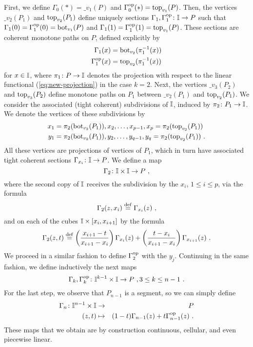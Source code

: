 First, we define $\Gamma_0 (*) = \bm_{v_1}(P)$ and $\Gamma_0^{\mathrm{op}} (*) = \operatorname{top}_{v_1}(P)$.
Then, the vertices $\bm_{v_2}(P_1)$ and $\operatorname{top}_{v_2}(P_1)$ define uniquely sections $\Gamma_1, \Gamma_1^{\mathrm{op}} \colon \mathbb{I} \to P$ such that $\Gamma_1(0)=\Gamma_1^{\mathrm{op}}(0)=\operatorname{bot}_{v_1}(P)$ and $\Gamma_1(1)=\Gamma_1^{\mathrm{op}}(1)=\operatorname{top}_{v_1}(P)$.
These sections are coherent monotone paths on $P$, defined explicitly by
\begin{align*}
	\Gamma_1(x) & = \operatorname{bot}_{v_2}(\pi_1^{-1}(x)) \\
	\Gamma_1^{\mathrm{op}}(x) & = \operatorname{top}_{v_2}(\pi_1^{-1}(x))
\end{align*}
for $x \in \mathbb{I}$, where $\pi_1 \colon P \to \mathbb{I}$ denotes the projection with respect to the linear functional (\ref{eq:new-projection}) in the case $k=2$.
Next, the vertices $\bm_{v_3}(P_2)$ and $\operatorname{top}_{v_3}(P_2)$ define monotone paths on $P_1$ between $\bm_{v_2}(P_1)$ and $\operatorname{top}_{v_2}(P_1)$.
We consider the associated (tight coherent) subdivisions of $\mathbb{I}$, induced by $\pi_2 \colon P_1 \to \mathbb{I}$.
We denote the vertices of these subdivisions by
\begin{align*}
	x_1 & = \pi_2(\operatorname{bot}_{v_2}(P_1)), x_2, \ldots, x_{p-1}, x_p=\pi_2(\operatorname{top}_{v_2}(P_1)) \\
	y_1 & = \pi_2(\operatorname{bot}_{v_2}(P_1)), y_2, \ldots, y_{q-1}, y_q=\pi_2(\operatorname{top}_{v_2}(P_1)) \ .
\end{align*}
All these vertices are projections of vertices of $P_1$, which in turn have associated tight coherent sections $\Gamma_{x_i} \colon \mathbb{I} \to P$.
We define a map
\[
\Gamma_2 \colon \mathbb{I} \times \mathbb{I} \to P \ ,
\]
where the second copy of $\mathbb{I}$ receives the subdivision by the $x_i$, $1\leq i \leq p$, via the formula
\[
\Gamma_2(z, x_i) \stackrel{\mathrm{def}}{=} \Gamma_{x_i}(z) \ ,
\]
and on each of the cubes $\mathbb{I} \times [x_i,x_{i+1}]$ by the formula
\[
\Gamma_2(z,t) \stackrel{\mathrm{def}}{=} \left( \frac{x_{i+1}-t}{x_{i+1}-x_i} \right) \Gamma_{x_i}(z) + \left( \frac{t-x_i}{x_{i+1}-x_i} \right) \Gamma_{x_{i+1}}(z) \ .
\]
We proceed in a similar fashion to define $\Gamma_2^{\mathrm{op}}$ with the $y_j$.
Continuing in the same fashion, we define inductively the next maps
\[
\Gamma_k, \Gamma_k^{\mathrm{op}} \colon \mathbb{I}^{k-1} \times \mathbb{I} \to P \ , 3 \leq k \leq n-1 \ .
\]
For the last step, we observe that $P_{n-1}$ is a segment, so we can simply define
\begin{eqnarray*}
	\Gamma_n \colon  \mathbb{I}^{n-1} \times \mathbb{I}  & \to & P \\
	(z,t) & \mapsto & (1-t)\Gamma_{n-1}(z) + t \Gamma_{n-1}^{\mathrm{op}} (z) \ .
\end{eqnarray*}
These maps that we obtain are by construction continuous, cellular, and even piecewise linear.
